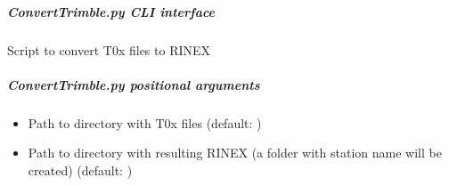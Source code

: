 \documentclass[letterpaper,10pt,english]{sphinxmanual}
\begin{document}
\subparagraph{ConvertTrimble.py \sphinxhyphen{} CLI interface}
\label{\detokenize{pgamit.com:ConvertTrimble.py---CLI-interface}}
\sphinxAtStartPar
Script to convert T0x files to RINEX

\begin{sphinxVerbatim}[commandchars=\\\{\}]
 \PYG{p}{[}\PYG{p}{]} \PYG{p}{[} \PYG{p}{]} \PYG{p}{[}   \PYG{p}{[}\PYG{p}{]}
                  \PYG{p}{[}  \PYG{p}{[}\PYG{p}{]} \PYG{p}{]}\PYG{p}{]}
                  \PYG{p}{[}  \PYG{p}{]} \PYG{p}{[}  \PYG{p}{]}
\end{sphinxVerbatim}


\subparagraph{ConvertTrimble.py positional arguments}
\label{\detokenize{pgamit.com:ConvertTrimble.py-positional-arguments}}\begin{itemize}
\item {} 
\sphinxAtStartPar
{\hyperref[\detokenize{pgamit.com:ConvertTrimble.py-_path-to-dir_}]{}} \sphinxhyphen{} Path to directory with T0x files (default: )

\item {} 
\sphinxAtStartPar
{\hyperref[\detokenize{pgamit.com:ConvertTrimble.py-_path-to-dir_}]{}} \sphinxhyphen{} Path to directory with resulting RINEX (a folder with station name will be created) (default: )

\end{itemize}
\end{document}
